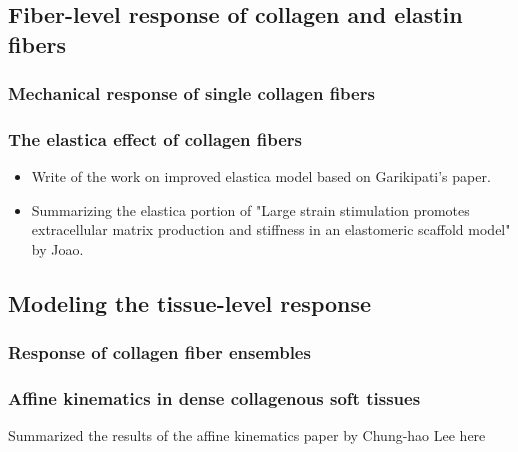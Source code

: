\subsection{Fiber-level response of collagen and elastin fibers}
\subsubsection{Mechanical response of single collagen fibers}
\subsubsection{The elastica effect of collagen fibers}
\begin{itemize}
\item Write of the work on improved elastica model based on Garikipati's paper.
\item Summarizing the elastica portion of "Large strain stimulation promotes extracellular matrix production and stiffness in an elastomeric scaffold model" by Joao. 
\end{itemize}

\subsection{Modeling the tissue-level response}
\subsubsection{Response of collagen fiber ensembles}
\subsubsection{Affine kinematics in dense collagenous soft tissues}
Summarized the results of the affine kinematics paper by Chung-hao Lee here



